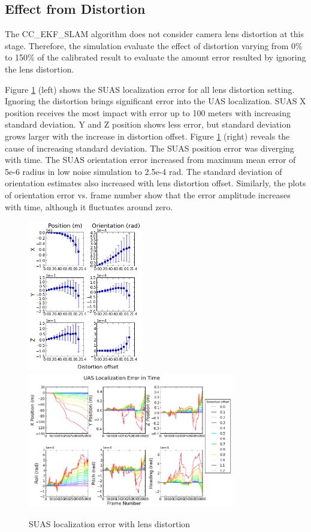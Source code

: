 \FloatBarrier

\subsection{Effect from Distortion}
The CC\_EKF\_SLAM algorithm does not consider camera lens distortion at this stage. Therefore, the simulation evaluate the effect of distortion varying from 0\% to 150\% of the calibrated result to evaluate the amount error resulted by ignoring the lens distortion. 

Figure \ref{fig:simfig48} (left) shows the SUAS localization error for all lens distortion setting. Ignoring the distortion brings significant error into the UAS localization. SUAS X position receives the most impact with error up to 100 meters with increasing standard deviation. Y and Z position shows less error, but standard deviation grows larger with the increase in distortion offset. Figure \ref{fig:simfig48} (right) reveals the cause of increasing standard deviation. The SUAS position error was diverging with time. The SUAS orientation error increased from maximum mean error of 5e-6 radius in low noise simulation to 2.5e-4 rad. The standard deviation of orientation estimates also increased with lens distortion offset. Similarly, the plots of orientation error vs. frame number show that the error amplitude increases with time, although it fluctuates around zero.

\begin{figure}[h]
  \centering
  \includegraphics[width=5cm,keepaspectratio=true]{./Figures/SimulationFigures/Figure47.png}
  \includegraphics[width=9cm,keepaspectratio=true]{./Figures/SimulationFigures/Figure48.png}
  \caption{SUAS localization error with lens distortion}
  \label{fig:simfig48}
\end{figure}


